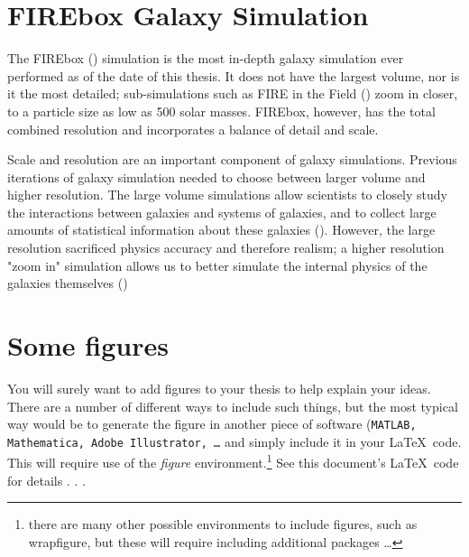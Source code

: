 \section{FIREbox Galaxy Simulation}
The FIREbox (\cite{feldmannFIREboxSimulatingGalaxies2022}) simulation is the most in-depth galaxy simulation ever performed as of the date of this thesis. It does not have the largest volume, nor is it the most detailed; sub-simulations such as FIRE in the Field (\cite{fittsFireFieldSimulating2017}) zoom in closer, to a particle size as low as 500 solar masses. FIREbox, however, has the total combined resolution and incorporates a balance of detail and scale.

Scale and resolution are an important component of galaxy simulations. Previous iterations of galaxy simulation needed to choose between larger volume and higher resolution. The large volume simulations allow scientists to closely study the interactions between galaxies and systems of galaxies, and to collect large amounts of statistical information about these galaxies (\cite{feldmannFIREboxSimulatingGalaxies2022}). However, the large resolution sacrificed physics accuracy and therefore realism; a higher resolution "zoom in" simulation allows us to better simulate the internal physics of the galaxies themselves (\cite{feldmannFIREboxSimulatingGalaxies2022})





\section{Some figures}

You will surely want to add figures to your thesis to help explain your ideas.  There are a number of different ways to include such things, but the most typical way would be to generate the figure in another piece of software (\texttt{MATLAB, Mathematica, Adobe Illustrator, \ldots} and simply include it in your \LaTeX ~code.  This will require use of the \emph{figure} environment.\footnote{there are many other possible environments to include figures, such as wrapfigure, but these will require including additional packages \ldots}  See this document's \LaTeX ~code for details . . .

